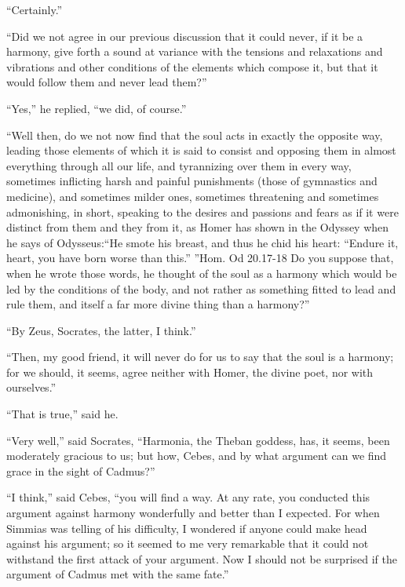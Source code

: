 \documentclass[letterpaper,12pt]{article}
\newcommand{\stephpag}[1]{\marginnote{\small\itshape\fontfamily{ppl}\selectfont #1}}
\begin{document}
\begin{drama}
``Certainly.''
 
``Did we not agree in our previous discussion that it could never, if it be a harmony, give forth a sound at variance with the tensions and relaxations and vibrations and other conditions of the elements which compose it, but that it would follow them and never lead them?''
 
``Yes,'' he replied, ``we did, of course.''
 
``Well then, do we not now find that the soul acts in exactly the opposite way, leading those elements of which it is said to consist and opposing them \stephpag{d} in almost everything through all our life, and tyrannizing over them in every way, sometimes inflicting harsh and painful punishments (those of gymnastics and medicine), and sometimes milder ones, sometimes threatening and sometimes admonishing, in short, speaking to the desires and passions and fears as if it were distinct from them and they from it, as Homer has shown in the Odyssey when he says of Odysseus:``He smote his breast, and thus he chid his heart:
``Endure it, heart, you have born worse than this.''
''Hom. Od 20.17-18 \stephpag{e} Do you suppose that, when he wrote those words, he thought of the soul as a harmony which would be led by the conditions of the body, and not rather as something fitted to lead and rule them, and itself a far more divine thing than a harmony?''
 
``By Zeus, Socrates, the latter, I think.''
 
``Then, my good friend, it will never do for us to say that the soul is a harmony; for we should, it seems, \stephpag{95 a} agree neither with Homer, the divine poet, nor with ourselves.''
 
``That is true,'' said he.
 
``Very well,'' said Socrates, ``Harmonia, the Theban goddess, has, it seems, been moderately gracious to us; but how, Cebes, and by what argument can we find grace in the sight of Cadmus?''
 
``I think,'' said Cebes, ``you will find a way. At any rate, you conducted this argument against harmony wonderfully and better than I expected. For when Simmias was telling of his difficulty, I wondered if anyone could make head against \stephpag{b} his argument; so it seemed to me very remarkable that it could not withstand the first attack of your argument. Now I should not be surprised if the argument of Cadmus met with the same fate.''
 

\end{drama}
\end{document}

